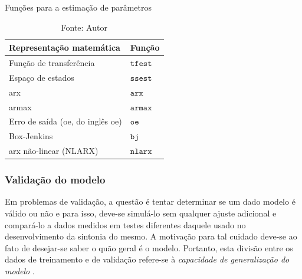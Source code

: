 \begin{table}[h]
	\centering
	\caption{Funções para a estimação de parâmetros}
	\label{tab:param_est_functions}
	\begin{tabular}{ll} \toprule
		{Representação matemática}		                                & {Função}				                    \\ \midrule
		Função de transferência		                                    & $\mathtt{tfest}$                          \\
		Espaço de estados   		                                    & $\mathtt{ssest}$                          \\
		\acrshort{arx}		                                            & $\mathtt{arx}$                            \\
		\acrshort{armax}		                                        & $\mathtt{armax}$                          \\
		Erro de saída (\acrshort{oe}, do inglês \acrlong{oe})		    & $\mathtt{oe}$                             \\
		Box-Jenkins             	                                    & $\mathtt{bj}$                             \\
		\acrshort{arx} não-linear (NLARX)                               & $\mathtt{nlarx}$                          \\ \bottomrule
	\end{tabular}
	\caption*{Fonte: Autor}
\end{table}

\subsubsection{Validação do modelo}
\label{subsubsec:validacao_do_modelo}

Em problemas de validação, a questão é tentar determinar se um dado modelo é válido ou não e para isso,
deve-se simulá-lo sem qualquer ajuste adicional e compará-lo a dados medidos em testes diferentes daquele
usado no desenvolvimento da sintonia do mesmo. A motivação para tal cuidado deve-se ao fato de desejar-se
saber o quão geral é o modelo. Portanto, esta divisão entre os dados de treinamento e de validação refere-se
à \textit{capacidade de generalização do modelo} \cite{Aguirre2015}.


